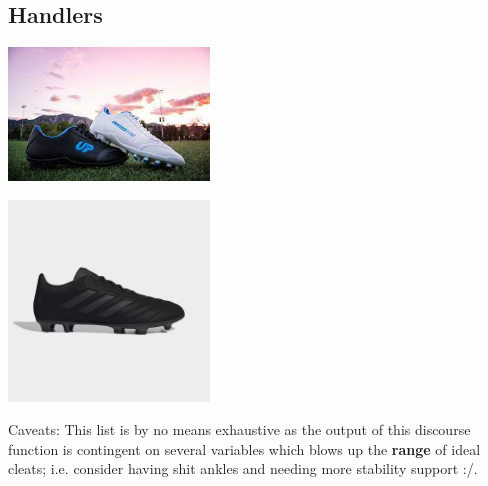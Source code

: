 \documentclass{article}
\begin{document}
\begin{answerbox}
\begin{multicols}{3}
    \subsection*{Handlers}
    \centering
        \begin{minipage}{0.3\textwidth}
            \centering
            \includegraphics[width=0.4\textwidth]{cleat3.png}
        \end{minipage}
        \begin{minipage}{0.3\textwidth}
            \centering
            \includegraphics[width=0.4\textwidth]{cleat5.png}
        \end{minipage}
    \end{multicols}

\end{answerbox}

Caveats: This list is by no means exhaustive as the output of this discourse function is contingent on several variables which blows up the \textbf{range} of ideal cleats; i.e. consider having shit ankles and needing more stability support :/.
\end{document}
